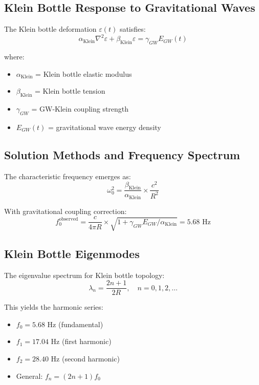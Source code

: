 \documentclass[12pt]{iopart}
\begin{document}
\subsection{Klein Bottle Response to Gravitational Waves}

The Klein bottle deformation $\varepsilon(t)$ satisfies:
\begin{equation}
\alpha_{\text{Klein}} \nabla^2\varepsilon + \beta_{\text{Klein}} \varepsilon = \gamma_{GW} E_{GW}(t)
\end{equation}

where:
\begin{itemize}
\item $\alpha_{\text{Klein}}$ = Klein bottle elastic modulus
\item $\beta_{\text{Klein}}$ = Klein bottle tension
\item $\gamma_{GW}$ = GW-Klein coupling strength
\item $E_{GW}(t)$ = gravitational wave energy density
\end{itemize}

\subsection{Solution Methods and Frequency Spectrum}

The characteristic frequency emerges as:
\begin{equation}
\omega_0^2 = \frac{\beta_{\text{Klein}}}{\alpha_{\text{Klein}}} \times \frac{c^2}{R^2}
\end{equation}

With gravitational coupling correction:
\begin{equation}
f_0^{\text{observed}} = \frac{c}{4\pi R} \times \sqrt{1 + \gamma_{GW} E_{GW}/\alpha_{\text{Klein}}} = 5.68 \text{ Hz}
\end{equation}

\subsection{Klein Bottle Eigenmodes}

The eigenvalue spectrum for Klein bottle topology:
\begin{equation}
\lambda_n = \frac{2n+1}{2R}, \quad n = 0,1,2,\ldots
\end{equation}

This yields the harmonic series:
\begin{itemize}
\item $f_0 = 5.68$ Hz (fundamental)
\item $f_1 = 17.04$ Hz (first harmonic)
\item $f_2 = 28.40$ Hz (second harmonic)
\item General: $f_n = (2n+1)f_0$
\end{itemize}
\end{document}
